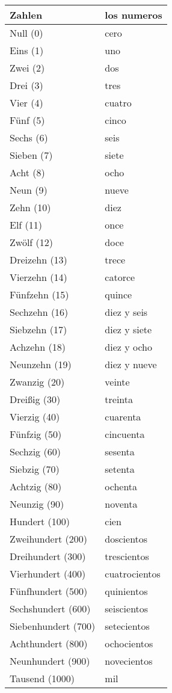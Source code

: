 \documentclass[10pt,spanish]{article}
\begin{document}
\begin{longtable}{p{} | p{}} 
\textbf{Zahlen}     & \textbf{los numeros}                                       \\ \hline
\hline
\endhead %
Null (0) & cero \\
Eins (1) & uno \\
Zwei (2) & dos \\
Drei (3) & tres \\
Vier (4) & cuatro \\
Fünf (5) & cinco \\
Sechs (6) & seis \\
Sieben (7) & siete \\
Acht (8) & ocho \\
Neun (9) & nueve \\
Zehn (10) & diez \\
Elf (11) & once \\
Zwölf (12) & doce \\
Dreizehn (13) & trece \\
Vierzehn (14) & catorce \\
Fünfzehn (15) & quince \\
Sechzehn (16) & diez y seis\\
Siebzehn (17) & diez y siete \\
Achzehn (18) & diez y ocho \\
Neunzehn (19) & diez y nueve \\
Zwanzig (20) & veinte \\
Dreißig (30) & treinta \\
Vierzig (40) & cuarenta \\
Fünfzig (50) & cincuenta \\
Sechzig (60) & sesenta \\
Siebzig (70) & setenta \\
Achtzig (80) & ochenta  \\
Neunzig (90) & noventa \\
Hundert (100) & cien \\
Zweihundert (200) & doscientos \\
Dreihundert (300) & trescientos \\
Vierhundert (400) & cuatrocientos \\
Fünfhundert (500) & quinientos \\
Sechshundert (600) & seiscientos \\
Siebenhundert (700) & setecientos \\
Achthundert (800) & ochocientos \\
Neunhundert (900) & novecientos \\
Tausend (1000) & mil \\

\end{longtable}
\end{document}
